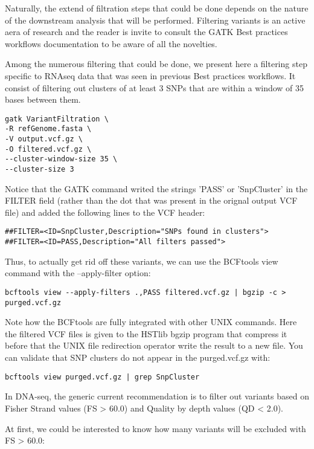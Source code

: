 Naturally, the extend of filtration steps that could be done depends on the nature of the downstream analysis that will be performed. Filtering variants is an active aera of research and the reader is invite to consult the GATK Best practices workflows documentation to be aware of all the novelties.

Among the numerous filtering that could be done, we present here a filtering step specific to RNAseq data that was seen in previous Best practices workflows. It consist of filtering out clusters of at least 3 SNPs that are within a window of 35 bases between them.


\begin{verbatim}
gatk VariantFiltration \
-R refGenome.fasta \
-V output.vcf.gz \
-O filtered.vcf.gz \
--cluster-window-size 35 \
--cluster-size 3
\end{verbatim}

Notice that the GATK command writed the strings 'PASS' or 'SnpCluster' in the FILTER field (rather than the dot that was present in the orignal output VCF file) and added the following lines to the VCF header:

\begin{verbatim}
##FILTER=<ID=SnpCluster,Description="SNPs found in clusters">
##FILTER=<ID=PASS,Description="All filters passed">
\end{verbatim}


Thus, to actually get rid off these variants, we can use the BCFtools view command with the --apply-filter option:
\begin{verbatim}
bcftools view --apply-filters .,PASS filtered.vcf.gz | bgzip -c > purged.vcf.gz
\end{verbatim}


Note how the BCFtools are fully integrated with other UNIX commands. Here the filtered VCF files is given to the HSTlib bgzip program that compress it before that the UNIX file redirection operator write the result to a new file. You can validate that SNP clusters do not appear in the purged.vcf.gz with:


\begin{verbatim}
bcftools view purged.vcf.gz | grep SnpCluster
\end{verbatim}

In DNA-seq, the generic current recommendation is to filter out variants based on Fisher Strand values (FS > 60.0) and Quality by depth values (QD < 2.0).

At first, we could be interested to know how many variants will be excluded with FS > 60.0:

